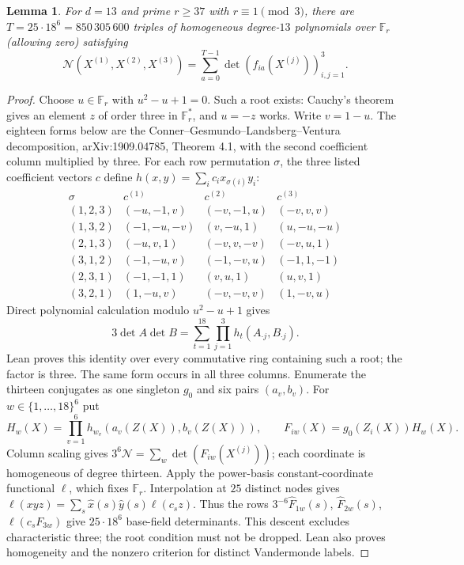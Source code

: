 \documentclass[11pt]{article}
\newtheorem{lemma}{Lemma}
\begin{document}
\begin{lemma}\label{lem:eighteen-norm}
For $d=13$ and prime $r\ge37$ with $r\equiv1\pmod3$, there are
$T=25\cdot18^6=850\,305\,600$ triples of homogeneous degree-$13$
polynomials over $\mathbb F_r$ (allowing zero) satisfying
\[
 \mathcal N(X^{(1)},X^{(2)},X^{(3)})
 =\sum_{a=0}^{T-1}\det(f_{ia}(X^{(j)}))_{i,j=1}^3.
\]
\end{lemma}
\begin{proof}
Choose $u\in\mathbb F_r$ with $u^2-u+1=0$. Such a root exists:
Cauchy's theorem gives an element $z$ of order three in $\mathbb F_r^*$,
and $u=-z$ works. Write $v=1-u$. The eighteen forms below are the
Conner--Gesmundo--Landsberg--Ventura decomposition,
arXiv:1909.04785, Theorem 4.1, with the second coefficient column
multiplied by three. For each row permutation $\sigma$, the three
listed coefficient vectors $c$ define $h(x,y)=\sum_i c_i x_{\sigma(i)}y_i$:
\[
\begin{array}{c|ccc}
\sigma & c^{(1)} & c^{(2)} & c^{(3)}\\\hline
(1,2,3)&(-u,-1,v)&(-v,-1,u)&(-v,v,v)\\
(1,3,2)&(-1,-u,-v)&(v,-u,1)&(u,-u,-u)\\
(2,1,3)&(-u,v,1)&(-v,v,-v)&(-v,u,1)\\
(3,1,2)&(-1,-u,v)&(-1,-v,u)&(-1,1,-1)\\
(2,3,1)&(-1,-1,1)&(v,u,1)&(u,v,1)\\
(3,2,1)&(1,-u,v)&(-v,-v,v)&(1,-v,u)
\end{array}
\]
Direct polynomial calculation modulo $u^2-u+1$ gives
\[
 3\det A\det B=\sum_{t=1}^{18}\prod_{j=1}^3
 h_t(A_{\cdot j},B_{\cdot j}).
\]
Lean proves this identity over every commutative ring containing such
a root; the factor is three. The same form occurs in all three columns.
Enumerate the thirteen conjugates as one singleton $g_0$ and six
pairs $(a_v,b_v)$. For $w\in\{1,\ldots,18\}^6$ put
\[
 H_w(X)=\prod_{v=1}^6h_{w_v}(a_v(Z(X)),b_v(Z(X))),\qquad
 F_{iw}(X)=g_0(Z_i(X))H_w(X).
\]
Column scaling gives $3^6\mathcal N=\sum_w\det(F_{iw}(X^{(j)}))$;
each coordinate is homogeneous of degree thirteen.
Apply the power-basis constant-coordinate functional $\ell$, which
fixes $\mathbb F_r$. Interpolation at $25$ distinct nodes gives
$\ell(xyz)=\sum_s\widehat x(s)\widehat y(s)\ell(c_sz)$.
Thus the rows $3^{-6}\widehat F_{1w}(s)$, $\widehat F_{2w}(s)$,
$\ell(c_sF_{3w})$ give $25\cdot18^6$ base-field determinants.
This descent excludes characteristic three; the root condition must
not be dropped. Lean also proves homogeneity and the nonzero criterion
for distinct Vandermonde labels.
\end{proof}
\end{document}
